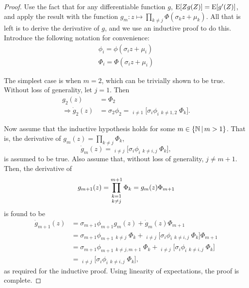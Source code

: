 \begin{proof}
  Use the fact that for any differentiable function $g$, $\operatorname{E}[Zg(Z)] = \operatorname{E}[g'(Z)]$, and apply the result with the function $g_m:z \mapsto \prod_{k \neq j} \Phi(\sigma_k z + \mu_k)$. All that is left is to derive the derivative of $g$, and we use an inductive proof to do this. 
  Introduce the following notation for convenience:
  \begingroup
  \setlength{\abovedisplayskip}{10pt}
  \begin{align*}
    \phi_i = \phi(\sigma_i z + \mu_i) \\
    \Phi_i = \Phi(\sigma_i z + \mu_i) 
  \end{align*}
  \endgroup
  
  The simplest case is when $m=2$, which can be trivially shown to be true. Without loss of generality, let $j=1$. Then
  \begin{align*}
    g_2(z) &= \Phi_2 \\
    \Rightarrow \dot g_2(z) &= \sigma_2 \phi_2 = \mathop{\sum_{i=1}^2}_{i \neq 1} \Bigg[ \sigma_i \phi_i \mathop{\sum_{k=1}^2}_{k \neq 1,2} \Phi_k \Bigg].
  \end{align*}
  
  Now assume that the inductive hypothesis holds for some $m \in \{\mathbb{N} \, | \, m > 1\}$. 
  That is, the derivative of $g_m(z) = \prod_{k \neq j} \Phi_k$, 
  \[
    \dot{g}_m(z) = \mathop{\sum_{i=1}^m}_{i \neq j} \bigg[  \sigma_i \phi_i \mathop{\prod_{k=1}^m}_{k \neq i,j} \Phi_k \bigg],
  \]
  is assumed to be true. 
  Also assume that, without loss of generality, $j \neq m+1$.
  Then, the derivative of
  \[
    g_{m+1}(z) = \mathop{\prod_{k=1}^{m+1}}_{k \neq j} \Phi_k = g_m(z) \Phi_{m+1}
    \vspace{-0.5em}
  \]
  \vspace{-0.5em}is found to be
  \begin{align*}
    \dot g_{m+1}(z) &= \sigma_{m+1} \phi_{m+1} g_m(z) + \dot g_m(z) \Phi_{m+1} \\
    &= \sigma_{m+1} \phi_{m+1} \mathop{\prod_{k=1}^m}_{k \neq j} \Phi_k + \mathop{\sum_{i=1}^m}_{i \neq j} \bigg[  \sigma_i \phi_i \mathop{\prod_{k=1}^m}_{k \neq i,j} \Phi_k \bigg] \Phi_{m+1} \\
    &= \sigma_{m+1} \phi_{m+1} \mathop{\prod_{k=1}^{m+1}}_{k \neq j, m+1} \Phi_k + \mathop{\sum_{i=1}^m}_{i \neq j} \bigg[  \sigma_i \phi_i \mathop{\prod_{k=1}^{m+1}}_{k \neq i,j} \Phi_k \bigg] \\
    &= \mathop{\sum_{i=1}^{m+1}}_{i \neq j} \bigg[  \sigma_i \phi_i \mathop{\prod_{k=1}^{m+1}}_{k \neq i,j} \Phi_k \bigg],
  \end{align*}
  as required for the inductive proof.
  Using linearity of expectations, the proof is complete.
\end{proof}

